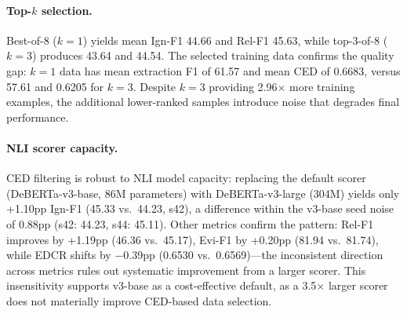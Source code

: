 \paragraph{Top-$k$ selection.} Best-of-8 ($k{=}1$) yields mean Ign-F1 44.66 and Rel-F1 45.63, while top-3-of-8 ($k{=}3$) produces 43.64 and 44.54. The selected training data confirms the quality gap: $k{=}1$ data has mean extraction F1 of 61.57 and mean CED of 0.6683, versus 57.61 and 0.6205 for $k{=}3$. Despite $k{=}3$ providing 2.96$\times$ more training examples, the additional lower-ranked samples introduce noise that degrades final performance.

\paragraph{NLI scorer capacity.} CED filtering is robust to NLI model capacity: replacing the default scorer (DeBERTa-v3-base, 86M parameters) with DeBERTa-v3-large (304M) yields only +1.10pp Ign-F1 (45.33 vs.\ 44.23, s42), a difference within the v3-base seed noise of 0.88pp (s42: 44.23, s44: 45.11). Other metrics confirm the pattern: Rel-F1 improves by +1.19pp (46.36 vs.\ 45.17), Evi-F1 by +0.20pp (81.94 vs.\ 81.74), while EDCR shifts by $-$0.39pp (0.6530 vs.\ 0.6569)---the inconsistent direction across metrics rules out systematic improvement from a larger scorer. This insensitivity supports v3-base as a cost-effective default, as a 3.5$\times$ larger scorer does not materially improve CED-based data selection.

